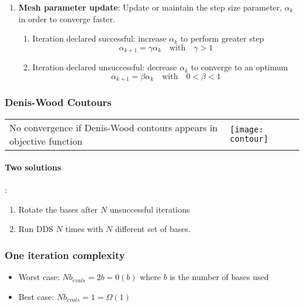 \begin{enumerate}
    \item \textbf{Mesh parameter update}: Update or maintain the step
        size parameter, $\alpha_k$ in order to converge faster.

        \begin{enumerate}
            \item Iteration declared successful: increase $\alpha_k$ to
                perform greater step
                $$\alpha_{k+1} = \gamma \alpha_k \quad \textrm{with}\quad \gamma > 1$$

            \item Iteration declared unsuccessful: decrease $\alpha_k$ to
                converge to an optimum
                $$\alpha_{k+1} = \beta \alpha_k \quad \textrm{with}\quad
                0 < \beta < 1$$
            \end{enumerate}
\end{enumerate}

\subsubsection{Denis-Wood Coutours}

\begin{tabular}{m{12cm}m{5cm}}
No convergence if Denis-Wood contours appears in objective
function
&
\texttt{[image: contour]}
\end{tabular}

\paragraph{Two solutions}:
\begin{enumerate}
    \item Rotate the bases after $N$ unsuccessful iterations
    \item Run DDS $N$ times with $N$ different set of bases.
    \end{enumerate}

\subsubsection{One iteration complexity}
\begin{itemize}
    \item Worst case: $Nb_{evals} = 2b = 0(b)$ where $b$ is the number
        of bases used
    \item Best case: $Nb_{evals} = 1 = \Omega(1)$
\end{itemize}


